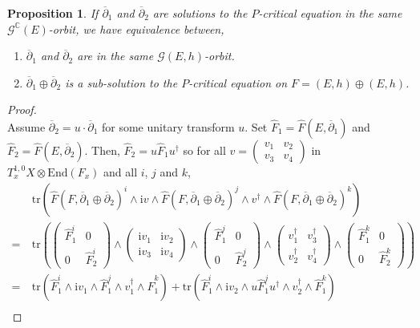 \documentclass{article}
\newtheorem{proposition}[theorem]{Proposition}
\theoremstyle{remark}
\theoremstyle{definition}
\newcommand{\C}{\mathbb{C}}
\newcommand{\End}{\mathrm{End}}
\newcommand{\tr}{\mathrm{tr}}
\renewcommand{\i}{\boldsymbol{\mathrm{i}}}
\newcommand{\G}{\mathcal{G}}
\newcommand{\dbar}{\overline{\partial}}
\begin{document}
\begin{proposition}\label{PRO:caractérisation unicité}
    If $\dbar_1$ and $\dbar_2$ are solutions to the $P$-critical equation in the same $\G^\C(E)$-orbit, we have equivalence between,
    \begin{enumerate}
        \item $\dbar_1$ and $\dbar_2$ are in the same $\G(E,h)$-orbit.
        \item $\dbar_1 \oplus \dbar_2$ is a sub-solution to the $P$-critical equation on $F = (E,h) \oplus (E,h)$.
    \end{enumerate}
\end{proposition}
\begin{proof}\ \\
\noindent{} Assume $\dbar_2 = u \cdot \dbar_1$ for some unitary transform $u$. Set $\hat{F}_1 = \hat{F}(E,\dbar_1)$ and $\hat{F}_2 = \hat{F}(E,\dbar_2)$. Then, $\hat{F}_2 = u\hat{F}_1u^\dagger$ so for all $v = \begin{pmatrix} v_1 & v_2 \\ v_3 & v_4 \end{pmatrix}$ in $T_x^{1,0}X \otimes \End(F_x)$ and all $i$, $j$ and $k$,
\begin{align*}
    & \tr(\hat{F}(F,\dbar_1 \oplus \dbar_2)^i \wedge \i v \wedge \hat{F}(F,\dbar_1 \oplus \dbar_2)^j \wedge v^\dagger \wedge \hat{F}(F,\dbar_1 \oplus \dbar_2)^k)\\
    =\ & \tr\left(\begin{pmatrix} \hat{F}_1^i & 0 \\ 0 & \hat{F}_2^i \end{pmatrix} \wedge \begin{pmatrix} \i v_1 & \i v_2 \\ \i v_3 & \i v_4 \end{pmatrix} \wedge \begin{pmatrix} \hat{F}_1^j & 0 \\ 0 & \hat{F}_2^j \end{pmatrix} \wedge \begin{pmatrix} v_1^\dagger & v_3^\dagger \\ v_2^\dagger & v_4^\dagger \end{pmatrix} \wedge \begin{pmatrix} \hat{F}_1^k & 0 \\ 0 & \hat{F}_2^k \end{pmatrix}\right)\\
    =\ & \tr(\hat{F}_1^i \wedge \i v_1 \wedge \hat{F}_1^j \wedge v_1^\dagger \wedge \hat{F}_1^k) + \tr(\hat{F}_1^i \wedge \i v_2 \wedge u\hat{F}_1^ju^\dagger \wedge v_2^\dagger \wedge \hat{F}_1^k)\\

\end{align*}
\end{proof}
\end{document}
